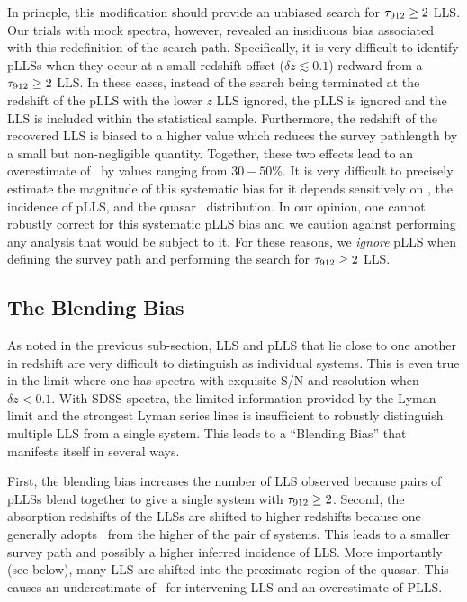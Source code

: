 \documentclass[12pt,preprint]{aastex}
\begin{document}
In princple, this modification should provide an unbiased
search for $\tau_{\rm 912} \ge 2$ LLS.  Our trials with mock spectra,
however, revealed an insidiuous bias associated with this
redefinition of the search path.  Specifically,  it is very
difficult to identify pLLSs when they occur at a small
redshift offset ($\delta z \lesssim 0.1$) redward
from a $\tau_{\rm 912} \ge 2$ LLS.
In these cases, instead of the search being terminated at
the redshift of the pLLS with the lower $z$ LLS ignored,
the pLLS is ignored and the LLS is included within the
statistical sample.   Furthermore, the redshift
of the recovered LLS is biased to a higher value which 
reduces the survey pathlength by a small but non-negligible
quantity.  Together, these two effects lead to an overestimate
of \lzlls\ by values ranging from $30-50$\%.  
It is very difficult to precisely estimate the magnitude of this
systematic bias for it depends sensitively on \lzlls, the 
incidence of pLLS, and the quasar \zem\ distribution.
In our opinion, one cannot robustly correct for 
this systematic pLLS bias and we caution against performing
any analysis that would be subject to it.
For these reasons, we {\it ignore} pLLS when defining
the survey path and performing the search for $\tau_{\rm 912} \ge 2$ LLS.


\subsection{The Blending Bias}


As noted in the previous sub-section, LLS and pLLS
that lie close to one another in redshift are very difficult
to distinguish as individual systems.
This is even true in the limit where one has spectra with
exquisite S/N and resolution when $\delta z < 0.1$.
With SDSS spectra, the limited information provided by the Lyman
limit and the strongest Lyman series lines is insufficient
to robustly distinguish multiple LLS from a single system.
This leads to a ``Blending Bias'' that manifests itself in several
ways.

First, the blending bias increases the number of LLS
observed because pairs of pLLSs blend together to give a single
system with $\tau_{\rm 912} \ge 2$.
Second, the absorption redshifts of the LLSs are shifted to higher
redshifts because one generally adopts \zlls\ from the higher
of the pair of systems.  
This leads to a smaller survey path and possibly a
higher inferred incidence of LLS. 
More importantly (see below), many LLS are shifted into the
proximate region of the quasar. 
This causes an underestimate of \lzlls\
for intervening LLS and an overestimate of PLLS.
\end{document}
